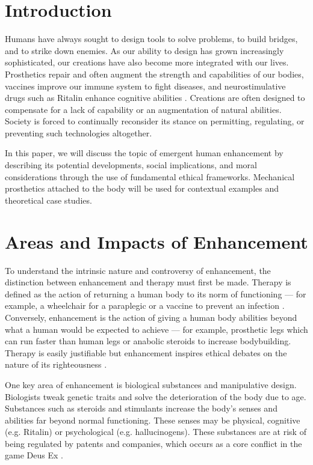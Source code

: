 \documentclass[10pt, oneside, letterpaper]{article}
\begin{document}
	\begin{multicols}{2}
	
	\section{Introduction}

	Humans have always sought to design tools to solve problems, to build bridges, and to strike down enemies. As our ability to design has grown increasingly sophisticated, our creations have also become more integrated with our lives. Prosthetics repair and often augment the strength and capabilities of our bodies, vaccines improve our immune system to fight diseases, and neurostimulative drugs such as Ritalin enhance cognitive abilities \cite{MyHealth2017}. Creations are often designed to compensate for a lack of capability or an augmentation of natural abilities. Society is forced to continually reconsider its stance on permitting, regulating, or preventing such technologies altogether.
	
	In this paper, we will discuss the topic of emergent human enhancement by describing its potential developments, social implications, and moral considerations through the use of fundamental ethical frameworks. Mechanical prosthetics attached to the body will be used for contextual examples and theoretical case studies.
	
	\section{Areas and Impacts of Enhancement}
	
	To understand the intrinsic nature and controversy of enhancement, the distinction between enhancement and therapy must first be made. Therapy is defined as the action of returning a human body to its norm of functioning --- for example, a wheelchair for a paraplegic or a vaccine to prevent an infection \cite{Allhoff2009}. Conversely, enhancement is the action of giving a human body abilities beyond what a human would be expected to achieve --- for example, prosthetic legs which can run faster than human legs or anabolic steroids to increase bodybuilding. Therapy is easily justifiable but enhancement inspires ethical debates on the nature of its righteousness \cite{Bostrom2008Eth}.
	
	One key area of enhancement is biological substances and manipulative design. Biologists tweak genetic traits and solve the deterioration of the body due to age. Substances such as steroids and stimulants increase the body's senses and abilities far beyond normal functioning. These senses may be physical, cognitive (e.g. Ritalin) or psychological (e.g. hallucinogens). These substances are at risk of being regulated by patents and companies, which occurs as a core conflict in the game Deus Ex \cite{Eidos2011}.
	

\end{multicols}
\end{document}
